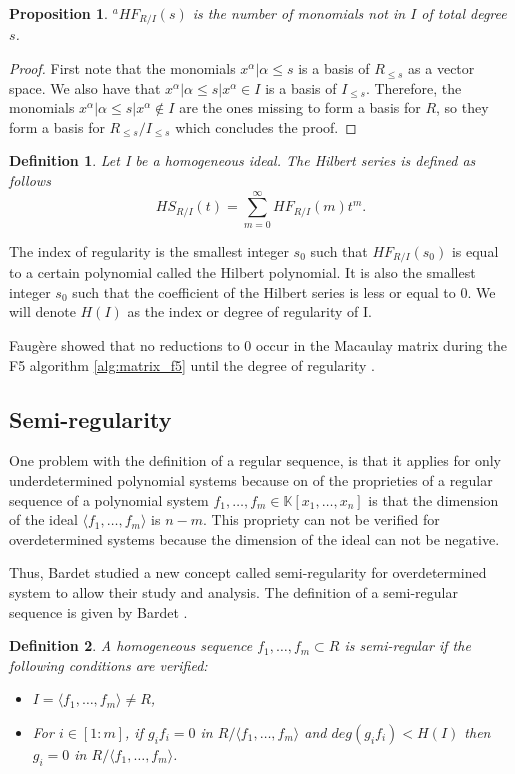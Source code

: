 \documentclass[english]{article}
\newtheorem{proposition}{Proposition}[section]
\newtheorem{definition}{Definition}[section]
\begin{document}
		\begin{proposition}
			${}^a HF_{R/I}(s)$ is the number of monomials not in $I$ of total degree $s$.
		\end{proposition}
		\begin{proof}
			First note that the monomials ${x^\alpha | \alpha \leq s}$ is a basis of $R_{\leq s}$ as a vector space. We also have that ${x^\alpha | \alpha \leq s | x^\alpha \in I}$ is a basis of $I_{\leq s}$. Therefore, the monomials ${x^\alpha | \alpha \leq s | x^\alpha \notin I}$ are the ones missing to form a basis for $R$, so they form a basis for $R_{\leq s} / I_{\leq s}$ which concludes the proof.
		\end{proof}
		
		\begin{definition}
			Let I be a homogeneous ideal. The Hilbert series is defined as follows
			$$
					HS_{R/I}(t) = \sum_{m=0}^{\infty} HF_{R/I}(m) t^m.
			$$	
		\end{definition}
		
		The index of regularity is the smallest integer $s_0$ such that $HF_{R/I}(s_0)$ is equal to a certain polynomial called the Hilbert polynomial. It is also the smallest integer $s_0$ such that the coefficient of the Hilbert series is less or equal to 0. We will denote $H(I)$ as the index or degree of regularity of I.
		
		Faugère showed that no reductions to 0 occur in the Macaulay matrix during the F5 algorithm \ref{alg:matrix_f5} until the degree of regularity \cite{F02}.
		
		\subsection{Semi-regularity}
		One problem with the definition of a regular sequence, is that it applies for only underdetermined  polynomial systems because on of the proprieties of a regular sequence of a polynomial system $f_1,\dots,f_m \in \mathbb{K}[x_1,\dots,x_n]$ is that the dimension of the ideal $\langle f_1,\dots,f_m \rangle$ is $n - m$. This propriety can not be verified for overdetermined systems because the dimension of the ideal can not be negative.
		
		Thus, Bardet studied a new concept called semi-regularity for overdetermined system to allow their study and analysis. The definition of a semi-regular sequence is given by Bardet \cite{Bardet04}.
		
		\begin{definition}
			A homogeneous sequence $f_1,\dots,f_m \subset R$ is semi-regular if the following conditions are verified:
			\begin{itemize}
				\item $I = \langle f_1,\dots,f_m \rangle \neq R$,
				\item For $i \in [1:m]$, if $g_if_i = 0$ in $R/\langle f_1,\dots,f_m \rangle$ and $deg(g_if_i) < H(I)$ then $g_i = 0$ in $R/\langle f_1,\dots,f_m \rangle$.
			\end{itemize} 
		\end{definition}
		
\end{document}
